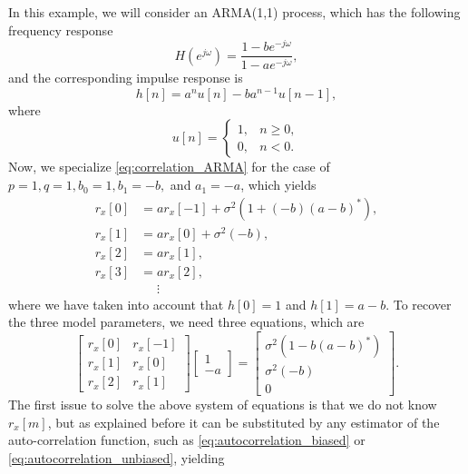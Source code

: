 \begin{example}
	
In this example, we will consider an ARMA(1,1) process, which has the following frequency response
\begin{equation}
H(e^{j \omega}) = \frac{1 - b e^{-j \omega}}{1 - a e^{-j \omega}},
\end{equation}
and the corresponding impulse response is
\begin{equation}
h[n] = a^n u[n] - b a^{n-1} u[n-1],
\end{equation}
where
\begin{equation}
u[n] = \begin{cases}
1, & n \geq 0, \\
0, & n < 0.
\end{cases}
\end{equation}
Now, we specialize \eqref{eq:correlation_ARMA} for the case of $p = 1, q = 1, b_0 = 1, b_1 = -b,$ and $a_1 = -a$, which yields
\begin{align*}
	r_x[0] &= a r_x[-1]  + \sigma^2 \left(1 + (-b) (a-b)^{\ast}\right), \\
	r_x[1] &= a r_x[0]  + \sigma^2  (-b), \\
	r_x[2] &= a r_x[1] , \\
	r_x[3] &= a r_x[2] , \\
	&\phantom{=} \vdots
\end{align*}
where we have taken into account that $h[0] = 1$ and $h[1] = a - b$. To recover the three model parameters, we need three equations, which are
\begin{equation}
	\begin{bmatrix}
	r_x[0] & r_x[-1] \\
	r_x[1] & r_x[0] \\
	r_x[2] & r_x[1] 
	\end{bmatrix}
	\begin{bmatrix}
	1 \\ -a
	\end{bmatrix} = 
	\begin{bmatrix}
	\sigma^2 \left(1 - b (a-b)^{\ast}\right) \\
	\sigma^2  (-b) \\
	0
	\end{bmatrix}.
\end{equation}
The first issue to solve the above system of equations is that we do not know $r_x[m]$, but as explained before it can be substituted by any estimator of the auto-correlation function, such as \eqref{eq:autocorrelation_biased} or \eqref{eq:autocorrelation_unbiased}, yielding

\end{example}
